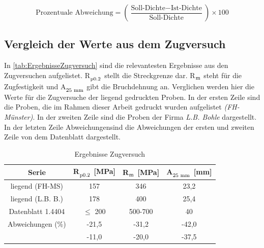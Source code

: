 \begin{equation}
  \text{Prozentuale Abweichung} = \left( \frac{\text{Soll-Dichte} - \text{Ist-Dichte}}{\text{Soll-Dichte}} \right) \times 100
  \label{Abweichungen}
\end{equation}
  


\subsection{Vergleich der Werte aus dem Zugversuch}

In \autoref{tab:ErgebnisseZugversuch} sind die relevantesten Ergebnisse aus den Zugversuchen aufgelistet. R$_{\textsubscript{p0.2}}$ stellt die Streckgrenze dar. R$_{\textsubscript{m}}$ steht für die Zugfestigkeit und A$_{\textsubscript{25 mm}}$ gibt die Bruchdehnung an. Verglichen werden hier die Werte für die Zugversuche der liegend gedruckten Proben. In der ersten Zeile sind die Proben, die im Rahmen dieser Arbeit gedruckt wurden aufgelistet \textit{(FH-Münster)}. In der zweiten Zeile sind die Proben der Firma \textit{L.B. Bohle} dargestellt. In der letzten Zeile \glqq Abweichungen\grqq sind die Abweichungen der ersten und zweiten Zeile von dem Datenblatt dargestellt.

\begin{table}[h]
  \centering
  \caption{Ergebnisse Zugversuch}
  \begin{tabular}{cccc}
  \toprule
  \textbf{Serie} & \textbf{R$_{\textsubscript{p0.2}}$ [MPa]} & \textbf{R$_{\textsubscript{m}}$ [MPa]} & \textbf{A$_{\textsubscript{25 mm}}$ [mm]} \\
  \midrule
  liegend (FH-MS) & 157 & 346 & 23,2 \\
  liegend (L.B. B.) & 178 & 400 & 25,4 \\
  Datenblatt 1.4404 \autocite{AGSTSteel:1.4404} & $\leq$ 200 & 500-700 & 40 \\
  \midrule
  Abweichungen (\%) 
    & -21,5 & -31,2 & -42,0 \\
    & -11,0 & -20,0 & -37,5 \\
  \bottomrule
  \end{tabular}
\label{tab:ErgebnisseZugversuch}
\end{table}

